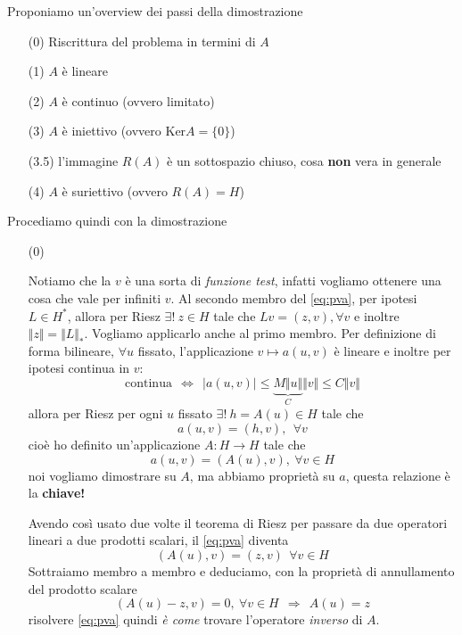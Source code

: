 \documentclass[10pt,a4paper,twoside,openright]{book}
\begin{document}
\begin{dimostrazione}
	Proponiamo un'overview dei passi della dimostrazione
	\begin{enumerate}
		\item[(0)] Riscrittura del problema in termini di $A$
		\item[(1)] $A$ è lineare
		\item[(2)] $A$ è continuo (ovvero limitato)
		\item[(3)] $A$ è iniettivo (ovvero $\mathrm{Ker} A=\{0\}$)
		\item[(3.5)] l'immagine $R(A)$ è un sottospazio chiuso, cosa \textbf{non} vera in generale
		\item[(4)] $A$ è suriettivo (ovvero $R(A) =H$)
	\end{enumerate}
	Procediamo quindi con la dimostrazione
	\begin{itemize}
		\item[(0)]

		Notiamo che la $v$ è una sorta di \textit{funzione test}, infatti vogliamo ottenere una cosa che vale per infiniti $v$. Al secondo membro del \eqref{eq:pva}, per ipotesi $L\in H^{*}$, allora per Riesz $\exists !\ z\in H$ tale che $Lv=(z,v),\forall v$ e inoltre $\Vert z\Vert =\Vert L\Vert _{*}$. Vogliamo applicarlo anche al primo membro. Per definizione di forma bilineare, $\forall u$ fissato, l'applicazione $v\mapsto a(u,v)$ è lineare e inoltre per ipotesi continua in $v$:
		\begin{equation*}
			\text{continua} \ \ \Leftrightarrow \ \ | a(u,v)| \leqslant \underbrace{M\Vert u\Vert }_{C}\Vert v\Vert \leqslant C\Vert v\Vert 
		\end{equation*}
		allora per Riesz per ogni $u$ fissato $\exists !\ h=A(u) \in H$ tale che
		\begin{equation*}
			a(u,v) =(h,v),\ \ \forall v
		\end{equation*}
		cioè ho definito un'applicazione $A:H\rightarrow H$ tale che
		\begin{equation*}
			\boxed{a(u,v) =(A(u),v),\ \forall v\in H}
		\end{equation*}
		noi vogliamo dimostrare su $A$, ma abbiamo proprietà su $a$, questa relazione è la \textbf{chiave!}

		Avendo così usato due volte il teorema di Riesz per passare da due operatori lineari a due prodotti scalari, il \eqref{eq:pva} diventa
		\begin{equation*}
			(A(u),v) =(z,v) \ \ \forall v\in H
		\end{equation*}
		Sottraiamo membro a membro e deduciamo, con la proprietà di annullamento del prodotto scalare
		\begin{equation*}
			(A(u) -z,v) =0,\ \forall v\in H\ \ \Rightarrow \ \ \boxed{A(u) =z}
		\end{equation*}
		risolvere \eqref{eq:pva} quindi \textit{è come} trovare l'operatore \textit{inverso} di $A$.




\end{itemize}
\end{dimostrazione}
\end{document}
